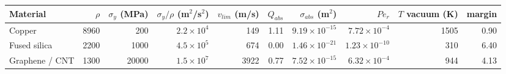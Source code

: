 \begin{tabular}{lrrrrrrrrr}
\hline
Material & $\rho$ & $\sigma_y$ (MPa) & $\sigma_y/\rho$ (m$^2$/s$^2$) & $v_{lim}$ (m/s) & $Q_{abs}$ & $\sigma_{abs}$ (m$^2$) & $Pe_r$ & $T$ vacuum (K) & margin \\
\hline
Copper & 8960 & 200 & $2.2\times10^{4}$ & 149 & 1.11 & $9.19\times10^{-15}$ & $7.72\times10^{-4}$ & 1505 & 0.90 \\
Fused silica & 2200 & 1000 & $4.5\times10^{5}$ & 674 & 0.00 & $1.46\times10^{-21}$ & $1.23\times10^{-10}$ & 310 & 6.40 \\
Graphene / CNT & 1300 & 20000 & $1.5\times10^{7}$ & 3922 & 0.77 & $7.52\times10^{-15}$ & $6.32\times10^{-4}$ & 944 & 4.13 \\
\hline
\end{tabular}
